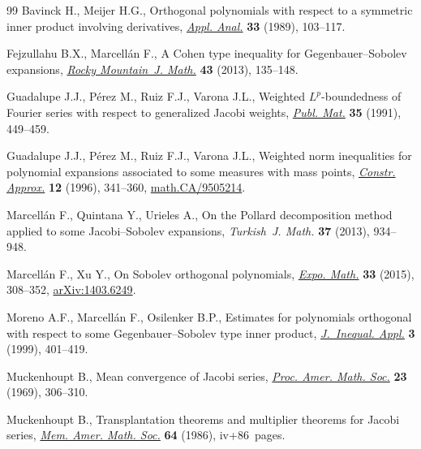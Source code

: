 \documentclass[11pt]{article}
\numberwithin{equation}{section}
\begin{document}
\begin{thebibliography}{99}
Bavinck H., Meijer H.G., Orthogonal polynomials with respect to a symmetric
 inner product involving derivatives, \href{https://doi.org/10.1080/00036818908839864}{\textit{Appl. Anal.}} \textbf{33} (1989),
 103--117.

Fejzullahu B.X., Marcell\'an F., A {C}ohen type inequality for
 {G}egenbauer--{S}obolev expansions, \href{https://doi.org/10.1216/RMJ-2013-43-1-135}{\textit{Rocky Mountain~J. Math.}}
 \textbf{43} (2013), 135--148.

Guadalupe J.J., P\'erez M., Ruiz F.J., Varona J.L., Weighted
 {$L^p$}-boundedness of {F}ourier series with respect to generalized {J}acobi
 weights, \href{https://doi.org/10.5565/PUBLMAT_35291_08}{\textit{Publ. Mat.}} \textbf{35} (1991), 449--459.

Guadalupe J.J., P\'erez M., Ruiz F.J., Varona J.L., Weighted norm inequalities
 for polynomial expansions associated to some measures with mass points,
 \href{https://doi.org/10.1007/s003659900018}{\textit{Constr. Approx.}} \textbf{12} (1996), 341--360,
 \href{https://arxiv.org/abs/math.CA/9505214}{math.CA/9505214}.

Marcell\'an F., Quintana Y., Urieles A., On the {P}ollard decomposition method
 applied to some {J}acobi--{S}obolev expansions, \textit{Turkish~J. Math.}
 \textbf{37} (2013), 934--948.

Marcell\'an F., Xu Y., On {S}obolev orthogonal polynomials, \href{https://doi.org/10.1016/j.exmath.2014.10.002}{\textit{Expo.
 Math.}} \textbf{33} (2015), 308--352, \href{https://arxiv.org/abs/1403.6249}{arXiv:1403.6249}.

Moreno A.F., Marcell\'an F., Osilenker B.P., Estimates for polynomials
 orthogonal with respect to some {G}egenbauer--{S}obolev type inner product,
 \href{https://doi.org/10.1155/S1025583499000260}{\textit{J.~Inequal. Appl.}} \textbf{3} (1999), 401--419.

Muckenhoupt B., Mean convergence of {J}acobi series, \href{https://doi.org/10.2307/2037162}{\textit{Proc. Amer. Math.
 Soc.}} \textbf{23} (1969), 306--310.

Muckenhoupt B., Transplantation theorems and multiplier theorems for {J}acobi
 series, \href{https://doi.org/10.1090/memo/0356}{\textit{Mem. Amer. Math. Soc.}} \textbf{64} (1986), iv+86~pages.


\end{thebibliography}
\end{document}

